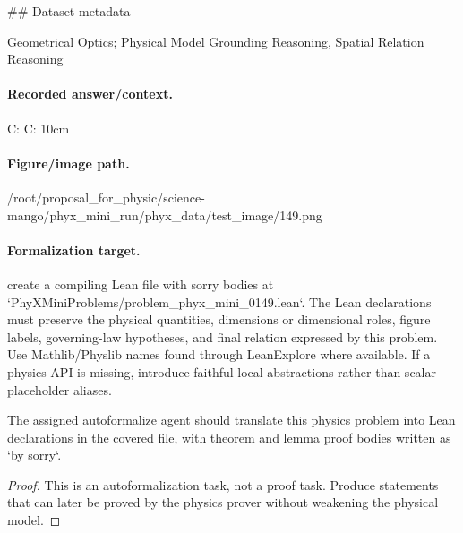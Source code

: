 \#\# Dataset metadata

Geometrical Optics; Physical Model Grounding Reasoning, Spatial Relation Reasoning

\paragraph{Recorded answer/context.}
C: C: 10cm

\paragraph{Figure/image path.}
/root/proposal\_for\_physic/science-mango/phyx\_mini\_run/phyx\_data/test\_image/149.png

\paragraph{Formalization target.}
create a compiling Lean file with sorry bodies at `PhyXMiniProblems/problem\_phyx\_mini\_0149.lean`. The Lean declarations must preserve the physical quantities, dimensions or dimensional roles, figure labels, governing-law hypotheses, and final relation expressed by this problem.
Use Mathlib/Physlib names found through LeanExplore where available. If a physics API is missing, introduce faithful local abstractions rather than scalar placeholder aliases.

\begin{theorem}
\label{thm:physics:phyx_mini_0149:target}
The assigned autoformalize agent should translate this physics problem into Lean declarations in the covered file, with theorem and lemma proof bodies written as `by sorry`.
\end{theorem}
\begin{proof}
This is an autoformalization task, not a proof task. Produce statements that can later be proved by the physics prover without weakening the physical model.
\end{proof}

